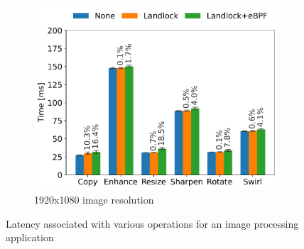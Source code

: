 \begin{figure}[t!]
\begin{center}
\begin{subfigure}[b]{0.5\linewidth}
      \centering
      \includegraphics[width=\linewidth]{chapters/dmng/fig/convert_large.pdf}
      \caption{1920x1080 image resolution}
      \label{fig:convert-large-times}
    \end{subfigure}
  \end{center}
  \caption[Latency of image processing operations]{
      Latency associated with various operations for an image
      processing application
  }
  \label{fig:convert-times}
\end{figure}

